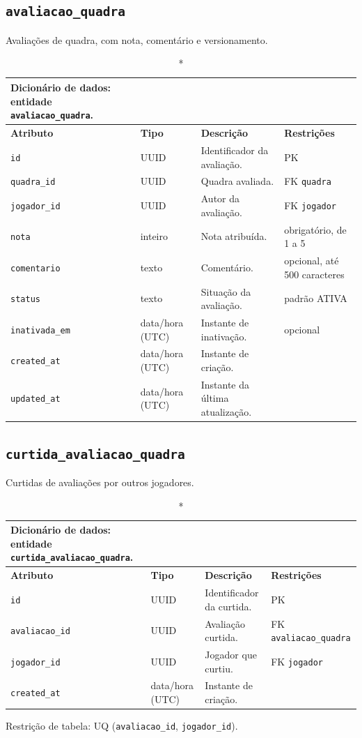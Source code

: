 \begin{apendicesenv}
    \subsection*{\texttt{avaliacao\_quadra}}
    Avaliações de quadra, com nota, comentário e versionamento.
    \begin{longtable}{p{2.5cm}p{2.1cm}p{5.8cm}p{2.9cm}}
    \caption*{Dicionário de dados: entidade \texttt{avaliacao\_quadra}.}\\
        \hline
        \textbf{Atributo} & \textbf{Tipo} & \textbf{Descrição} & \textbf{Restrições} \\
        \hline
        \endhead
        \texttt{id} & UUID & Identificador da avaliação. & PK \\
        \texttt{quadra\_id} & UUID & Quadra avaliada. & FK \texttt{quadra} \\
        \texttt{jogador\_id} & UUID & Autor da avaliação. & FK \texttt{jogador} \\
        \texttt{nota} & inteiro & Nota atribuída. & obrigatório, de 1 a 5 \\
        \texttt{comentario} & texto & Comentário. & opcional, até 500 caracteres \\
        \texttt{status} & texto & Situação da avaliação. & padrão ATIVA \\
        \texttt{inativada\_em} & data/hora (UTC) & Instante de inativação. & opcional \\
        \texttt{created\_at} & data/hora (UTC) & Instante de criação. & \\
        \texttt{updated\_at} & data/hora (UTC) & Instante da última atualização. & \\
        \hline
    \end{longtable}

    \subsection*{\texttt{curtida\_avaliacao\_quadra}}
    Curtidas de avaliações por outros jogadores.
    \begin{longtable}{p{2.5cm}p{2.1cm}p{5.8cm}p{2.9cm}}
    \caption*{Dicionário de dados: entidade \texttt{curtida\_avaliacao\_quadra}.}\\
        \hline
        \textbf{Atributo} & \textbf{Tipo} & \textbf{Descrição} & \textbf{Restrições} \\
        \hline
        \endhead
        \texttt{id} & UUID & Identificador da curtida. & PK \\
        \texttt{avaliacao\_id} & UUID & Avaliação curtida. & FK \texttt{avaliacao\_quadra} \\
        \texttt{jogador\_id} & UUID & Jogador que curtiu. & FK \texttt{jogador} \\
        \texttt{created\_at} & data/hora (UTC) & Instante de criação. & \\
        \hline
    \end{longtable}
    \noindent Restrição de tabela: UQ (\texttt{avaliacao\_id}, \texttt{jogador\_id}).


\end{apendicesenv}

